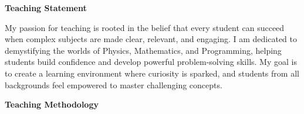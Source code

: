 \documentclass[letter,11pt]{article}
\begin{document}
\vspace{8mm}

\begin{center}
    \Large \textbf{Teaching Statement}
\end{center}
\vspace{5mm}

My passion for teaching is rooted in the belief that every student 
can succeed when complex subjects are made clear, relevant, and engaging. 
I am dedicated to demystifying the worlds of Physics, Mathematics, and Programming, 
helping students build confidence and develop powerful problem-solving skills. 
My goal is to create a learning environment where curiosity is sparked, and students 
from all backgrounds feel empowered to master challenging concepts.


\vspace{4mm}
\noindent\textbf{Teaching Methodology}
\end{document}
